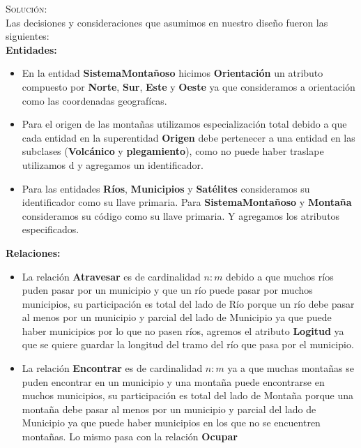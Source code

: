 \documentclass[letterpaper,11pt]{article}
\begin{document}
\begin{itemize}
\begin{itemize}
        \textsc{Solución:}\\
        Las decisiones y consideraciones que asumimos en nuestro diseño fueron
        las siguientes:\\

       \textbf{Entidades:}
       \begin{itemize}
       \item En la entidad \textbf{SistemaMontañoso} hicimos \textbf{Orientación}
             un atributo compuesto por \textbf{Norte}, \textbf{Sur}, \textbf{Este}
             y \textbf{Oeste} ya que consideramos a orientación como las coordenadas
             geografícas.
       \item Para el origen de las montañas utilizamos especialización total debido
             a que cada entidad en la superentidad \textbf{Origen} debe pertenecer a
             una entidad en las subclases (\textbf{Volcánico} y \textbf{plegamiento}),
             como no puede haber traslape utilizamos d y agregamos un identificador.
       \item Para las entidades \textbf{Ríos}, \textbf{Municipios} y \textbf{Satélites}
             consideramos su identificador como su llave primaria. Para \textbf{SistemaMontañoso}
             y \textbf{Montaña} consideramos su código como su llave primaria. Y agregamos
             los atributos especificados.
       \end{itemize}

      \textbf{Relaciones: }
      \begin{itemize}
      \item La relación \textbf{Atravesar} es de cardinalidad $n:m$ debido
            a que muchos ríos puden pasar por un municipio y que un río puede
            pasar por muchos municipios, su participación es total del lado de
            Río porque un río debe pasar al menos por un municipio y parcial del
            lado de Municipio ya que puede haber municipios por lo que no pasen ríos,
            agremos el atributo \textbf{Logitud} ya que se quiere guardar la longitud
            del tramo del río que pasa por el municipio.
      \item La relación \textbf{Encontrar} es de cardinalidad $n:m$ ya
            a que muchas montañas se puden encontrar en un municipio y una montaña puede
            encontrarse en muchos municipios, su participación es total del lado de
           Montaña porque una montaña debe pasar al menos por un municipio y parcial del
           lado de Municipio ya que puede haber municipios en los que no se encuentren
           montañas. Lo mismo pasa con la relación \textbf{Ocupar}


\end{itemize}
\end{itemize}
\end{itemize}
\end{document}
